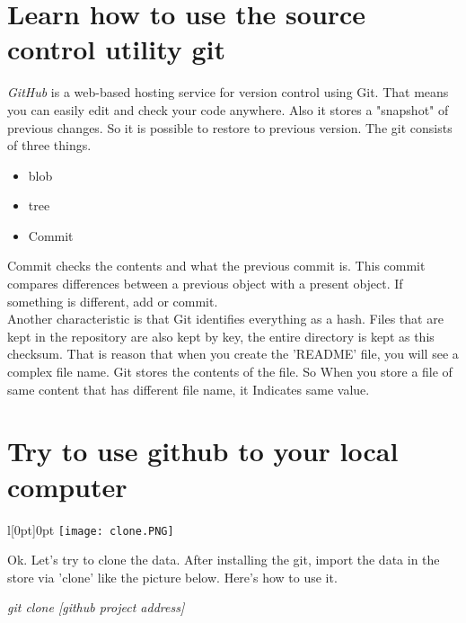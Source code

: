 \documentclass[10pt]{article} %
\begin{document}
\begin{minipage}[t]{.95\linewidth} 
\section{\label{sec:level4}{\large Learn how to use the source control utility git}}
\textsl{GitHub} is a web-based hosting service for version control using Git. That means you can easily edit and check your code anywhere. Also it stores a "snapshot" of previous changes. So it is possible to restore to previous version. The git consists of three things.
\begin{itemize}
\item blob
\item tree
\item Commit
\end{itemize}
Commit checks the contents and what the previous commit is. This commit compares differences between a previous object with a present object. If something is different, add or commit.\\
Another characteristic is that Git identifies everything as a hash. Files that are kept in the repository are also kept by key, the entire directory is kept as this checksum. That is reason that when you create the 'README' file, you will see a complex file name. Git stores the contents of the file. So When you store a file of same content that has different file name, it Indicates same value.\\
\section{\label{sec:level5}{\large Try to use github to your local computer}}
\begin{wrapfigure}[7]{l}[0pt]{0pt}
\texttt{[image: clone.PNG]}
\end{wrapfigure}
Ok. Let's try to clone the data. After installing the git, import the data in the store via 'clone' like the picture below. Here's how to use it.\\
\begin{center}
\parbox[t]{.60\linewidth}{\textsl{git clone [github project address]}}\\
\end{center}
\vspace{1cm}


\end{minipage}
\end{document}
